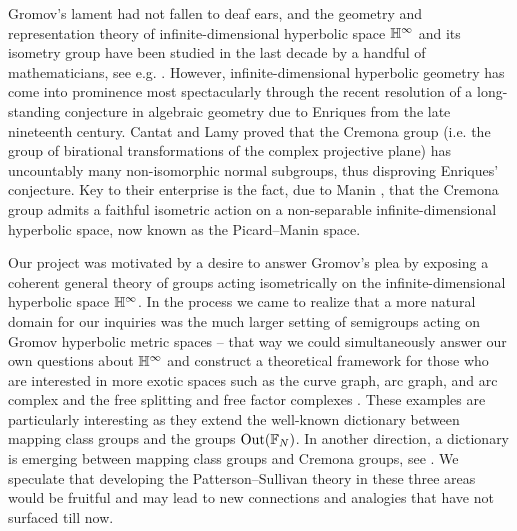 Gromov's lament had not fallen to deaf ears, and the geometry and representation theory of infinite-dimensional hyperbolic space $\H^\infty$ and its isometry group have been studied in the last decade by a handful of mathematicians, see e.g. \cite{BIM, DelzantPy, MonodPy}. However, infinite-dimensional hyperbolic geometry has come into prominence most spectacularly through the recent resolution of a long-standing conjecture in algebraic geometry due to Enriques from the late nineteenth century. Cantat and Lamy \cite{CantatLamy} proved that the Cremona group (i.e. the group of birational transformations of the complex projective plane) has uncountably many non-isomorphic normal subgroups, thus disproving Enriques' conjecture. Key to their enterprise is the fact, due to Manin \cite{Manin}, that the Cremona group admits a faithful isometric action on a non-separable infinite-dimensional hyperbolic space, now known as the Picard--Manin space.

Our project was motivated by a desire to answer Gromov's plea by exposing a coherent general theory of groups acting isometrically on the infinite-dimensional hyperbolic space $\H^\infty$. In the process we came to realize that a more natural domain for our inquiries was the much larger setting of semigroups acting on Gromov hyperbolic metric spaces -- that way we could simultaneously answer our own questions about $\H^\infty$ and construct a theoretical framework for those who are interested in more exotic spaces such as the curve graph, arc graph, and arc complex \cite{HPW, MasurSchleimer, HilionHorbez} and the free splitting and free factor complexes \cite{HandelMosher, BestvinaFeighn, KapovichRafi, HilionHorbez}. These examples are particularly interesting as they extend the well-known dictionary \cite[p.375]{Bestvina_survey} between mapping class groups and the groups $\Out(\F_N)$. In another direction, a dictionary is emerging between mapping class groups and Cremona groups, see \cite{BlancCantat, DHKK}. We speculate that developing the Patterson--Sullivan theory in these three areas would be fruitful and may lead to new connections and analogies that have not surfaced till now.

